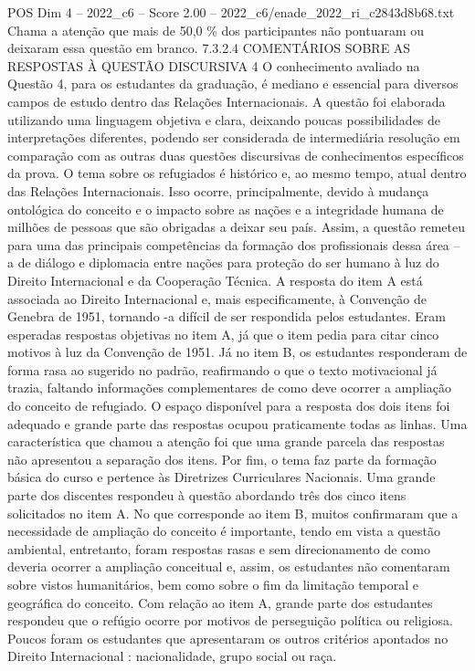 \begin{textsample}{POS Dim 4 – 2022\_c6 – Score 2.00 – 2022\_c6/enade\_2022\_ri\_c2843d8b68.txt}
Chama a atenção que mais de 50,0 \% dos participantes não pontuaram ou deixaram essa questão em branco. 7.3.2.4 COMENTÁRIOS SOBRE AS RESPOSTAS À QUESTÃO DISCURSIVA 4 O conhecimento avaliado na Questão 4, para os estudantes da graduação, é mediano e essencial para diversos campos de estudo dentro das Relações Internacionais.
A questão foi elaborada utilizando uma linguagem objetiva e clara, deixando poucas possibilidades de interpretações diferentes, podendo ser considerada de intermediária resolução em comparação com as outras duas questões discursivas de conhecimentos específicos da prova.
O tema sobre os refugiados é histórico e, ao mesmo tempo, atual dentro das Relações Internacionais.
Isso ocorre, principalmente, devido à mudança ontológica do conceito e o impacto sobre as nações e a integridade humana de milhões de pessoas que são obrigadas a deixar seu país.
Assim, a questão remeteu para uma das principais competências da formação dos profissionais dessa área – a de diálogo e diplomacia entre nações para proteção do ser humano à luz do Direito Internacional e da Cooperação Técnica.
A resposta do item A está associada ao Direito Internacional e, mais especificamente, à Convenção de Genebra de 1951, tornando -a difícil de ser respondida pelos estudantes.
Eram esperadas respostas objetivas no item A, já que o item pedia para citar cinco motivos à luz da Convenção de 1951.
Já no item B, os estudantes responderam de forma rasa ao sugerido no padrão, reafirmando o que o texto motivacional já trazia, faltando informações complementares de como deve ocorrer a ampliação do conceito de refugiado.
O espaço disponível para a resposta dos dois itens foi adequado e grande parte das respostas ocupou praticamente todas as linhas.
Uma característica que chamou a atenção foi que uma grande parcela das respostas não apresentou a separação dos itens.
Por fim, o tema faz parte da formação básica do curso e pertence às Diretrizes Curriculares Nacionais.
Uma grande parte dos discentes respondeu à questão abordando três dos cinco itens solicitados no item A.
No que corresponde ao item B, muitos confirmaram que a necessidade de ampliação do conceito é importante, tendo em vista a questão ambiental, entretanto, foram respostas rasas e sem direcionamento de como deveria ocorrer a ampliação conceitual e, assim, os estudantes não comentaram sobre vistos humanitários, bem como sobre o fim da limitação temporal e geográfica do conceito.
Com relação ao item A, grande parte dos estudantes respondeu que o refúgio ocorre por motivos de perseguição política ou religiosa.
Poucos foram os estudantes que apresentaram os outros critérios apontados no Direito Internacional : nacionalidade, grupo social ou raça.

\end{textsample}
